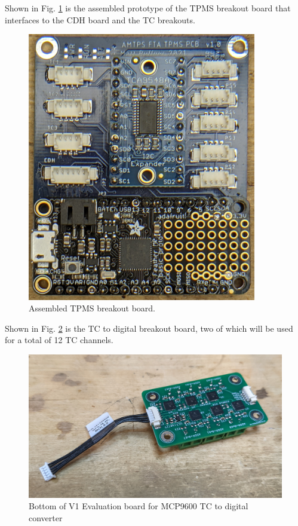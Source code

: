 \documentclass{article}
\begin{document}
Shown in Fig. \ref{fig:tpms-proto} is the assembled prototype of the TPMS breakout board that interfaces to the CDH board and the TC breakouts.
\begin{figure}[H]
	\centering
	\includegraphics[width=10cm]{images/tpms-breakout}
	\caption{Assembled TPMS breakout board.}
	\label{fig:tpms-proto}
\end{figure}

Shown in Fig. \ref{fig:tc-board-bottom} is the TC to digital breakout board, two of which will be used for a total of 12 TC channels.
\begin{figure}[H]
	\centering
	\includegraphics[width=13cm]{images/tc-board-bottom}
	\caption{Bottom of V1 Evaluation board for MCP9600 TC to digital converter}
	\label{fig:tc-board-bottom}
\end{figure}
\end{document}
